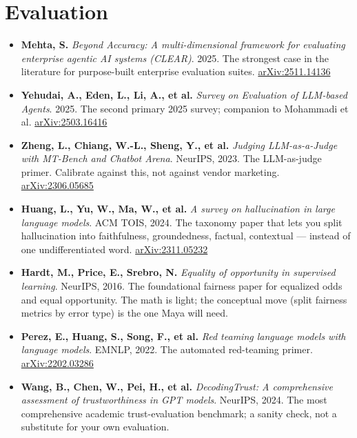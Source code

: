 \section{Evaluation}

\begin{itemize}
\item \textbf{Mehta, S.} \textit{Beyond Accuracy: A multi-dimensional framework for evaluating enterprise agentic AI systems (CLEAR)}. 2025. The strongest case in the literature for purpose-built enterprise evaluation suites. \href{https://arxiv.org/abs/2511.14136}{arXiv:2511.14136}

\item \textbf{Yehudai, A., Eden, L., Li, A., et al.} \textit{Survey on Evaluation of LLM-based Agents}. 2025. The second primary 2025 survey; companion to Mohammadi et al. \href{https://arxiv.org/abs/2503.16416}{arXiv:2503.16416}

\item \textbf{Zheng, L., Chiang, W.-L., Sheng, Y., et al.} \textit{Judging LLM-as-a-Judge with MT-Bench and Chatbot Arena}. NeurIPS, 2023. The LLM-as-judge primer. Calibrate against this, not against vendor marketing. \href{https://arxiv.org/abs/2306.05685}{arXiv:2306.05685}

\item \textbf{Huang, L., Yu, W., Ma, W., et al.} \textit{A survey on hallucination in large language models}. ACM TOIS, 2024. The taxonomy paper that lets you split hallucination into faithfulness, groundedness, factual, contextual --- instead of one undifferentiated word. \href{https://arxiv.org/abs/2311.05232}{arXiv:2311.05232}

\item \textbf{Hardt, M., Price, E., Srebro, N.} \textit{Equality of opportunity in supervised learning}. NeurIPS, 2016. The foundational fairness paper for equalized odds and equal opportunity. The math is light; the conceptual move (split fairness metrics by error type) is the one Maya will need.

\item \textbf{Perez, E., Huang, S., Song, F., et al.} \textit{Red teaming language models with language models}. EMNLP, 2022. The automated red-teaming primer. \href{https://arxiv.org/abs/2202.03286}{arXiv:2202.03286}

\item \textbf{Wang, B., Chen, W., Pei, H., et al.} \textit{DecodingTrust: A comprehensive assessment of trustworthiness in GPT models}. NeurIPS, 2024. The most comprehensive academic trust-evaluation benchmark; a sanity check, not a substitute for your own evaluation.
\end{itemize}

